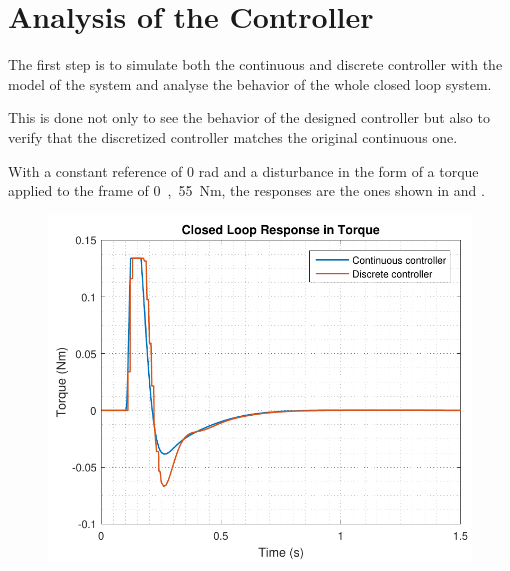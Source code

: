\section{Analysis of the Controller}\label{sec:ControllerVerification}

The first step is to simulate both the continuous and discrete controller with the model of the system and analyse the behavior of the whole closed loop system.

This is done not only to see the behavior of the designed controller but also to verify that the discretized controller matches the original continuous one. 

With a constant reference of 0 rad and a disturbance in the form of a torque applied to the frame of \si{0,55 Nm}, the responses are the ones shown in  and .
%
\begin{minipage}{0.45\linewidth}
	\begin{figure}[H]
      \includegraphics[scale=.5]{figures/torqueComp}
      \captionsetup{justification=centering}
      \label{discreteVsContinuousOutputController}
    \end{figure}\vspace{-5mm}
\end{minipage}
